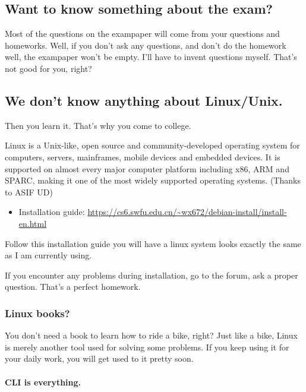 \documentclass{article}
\begin{document}
\subsection[Exam?]{Want to know something about the exam?}
\label{sec:exam}

Most of the questions on the exampaper will come from your questions and homeworks. Well,
if you don't ask any questions, and don't do the homework well, the exampaper won't be
empty. I'll have to invent questions myself. That's not good for you, right?

\subsection[Linux?]{We don't know anything about Linux/Unix.}
\label{sec:linux}

Then you learn it. That's why you come to college.
  
Linux is a Unix-like, open source and community-developed operating system for computers,
servers, mainframes, mobile devices and embedded devices. It is supported on almost every
major computer platform including x86, ARM and SPARC, making it one of the most widely
supported operating systems. (Thanks to ASIF UD)

\begin{itemize}
\item Installation guide:
  \url{https://cs6.swfu.edu.cn/~wx672/debian-install/install-en.html}
\end{itemize}
Follow this installation guide you will have a linux system looks exactly the same as I
am currently using.

If you encounter any problems during installation, go to the forum, ask a proper
question. That's a perfect homework.

\subsubsection{Linux books?}
\label{sec:linux-books}

You don't need a book to learn how to ride a bike, right? Just like a bike, Linux is
merely another tool used for solving some problems. If you keep using it for your daily
work, you will get used to it pretty soon.

\paragraph{CLI is everything.}
\end{document}
